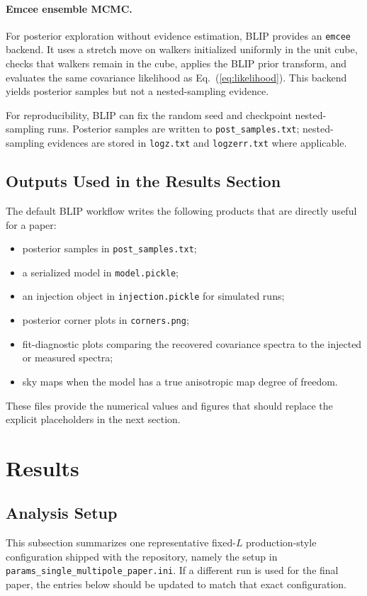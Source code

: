 \documentclass[11pt]{article}
\begin{document}
\paragraph{Emcee ensemble MCMC.}
For posterior exploration without evidence estimation, BLIP provides an \texttt{emcee} backend. It uses a stretch move on walkers initialized uniformly in the unit cube, checks that walkers remain in the cube, applies the BLIP prior transform, and evaluates the same covariance likelihood as Eq.~(\ref{eq:likelihood}). This backend yields posterior samples but not a nested-sampling evidence.

For reproducibility, BLIP can fix the random seed and checkpoint nested-sampling runs. Posterior samples are written to \texttt{post\_samples.txt}; nested-sampling evidences are stored in \texttt{logz.txt} and \texttt{logzerr.txt} where applicable.

\subsection{Outputs Used in the Results Section}
The default BLIP workflow writes the following products that are directly useful for a paper:
\begin{itemize}
\item posterior samples in \texttt{post\_samples.txt};
\item a serialized model in \texttt{model.pickle};
\item an injection object in \texttt{injection.pickle} for simulated runs;
\item posterior corner plots in \texttt{corners.png};
\item fit-diagnostic plots comparing the recovered covariance spectra to the injected or measured spectra;
\item sky maps when the model has a true anisotropic map degree of freedom.
\end{itemize}
These files provide the numerical values and figures that should replace the explicit placeholders in the next section.

\section{Results}
\subsection{Analysis Setup}
This subsection summarizes one representative fixed-$L$ production-style configuration shipped with the repository, namely the setup in \texttt{params\_single\_multipole\_paper.ini}. If a different run is used for the final paper, the entries below should be updated to match that exact configuration.
\end{document}
